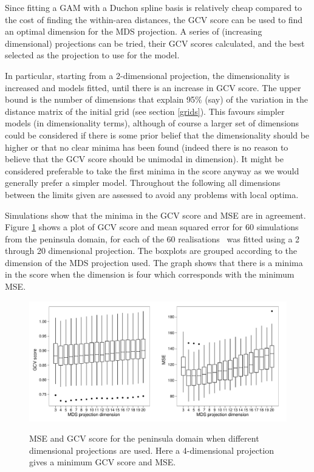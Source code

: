 Since fitting a GAM with a Duchon spline basis is relatively cheap compared to the cost of finding the within-area distances, the GCV score can be used to find an optimal dimension for the MDS projection. A series of (increasing dimensional) projections can be tried, their GCV scores calculated, and the best selected as the projection to use for the model.

In particular, starting from a 2-dimensional projection, the dimensionality is increased and models fitted, until there is an increase in GCV score. The upper bound is the number of dimensions that explain 95\% (say) of the variation in the distance matrix of the initial grid (see section \ref{grids}).  This favours simpler models (in dimensionality terms), although of course a larger set of dimensions could be considered if there is some prior belief that the dimensionality should be higher or that no clear minima has been found (indeed there is no reason to believe that the GCV score should be unimodal in dimension). It might be considered preferable to take the first minima in the score anyway as we would generally prefer a simpler model. Throughout the following all dimensions between the limits given are assessed to avoid any problems with local optima.

Simulations show that the minima in the GCV score and MSE are in agreement. Figure \ref{wt2-gcv-projdim-boxplot} shows a plot of GCV score and mean squared error for 60 simulations from the peninsula domain, for each of the 60 realisations \mdsds\ was fitted using a 2 through 20 dimensional projection. The boxplots are grouped according to the dimension of the MDS projection used. The graph shows that there is a minima in the score when the dimension is four which corresponds with the minimum MSE.

\begin{figure}
\centering
\includegraphics[width=6in]{mds/figs/wt2-gcv-projdim-boxplot.pdf} \\
\caption{MSE and GCV score for the peninsula domain when different dimensional projections are used. Here a 4-dimensional projection gives a minimum GCV score and MSE.}
\label{wt2-gcv-projdim-boxplot}
\end{figure}

